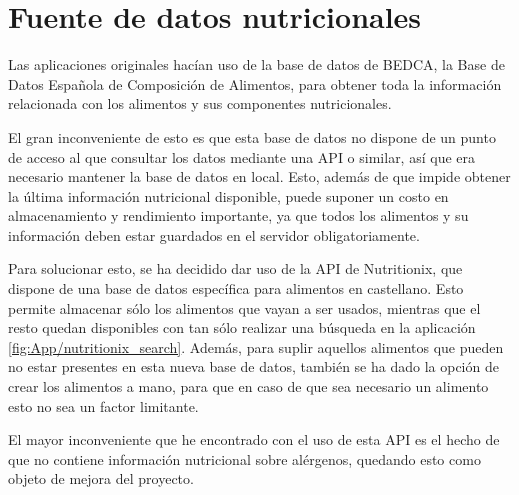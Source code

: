 
\section{Fuente de datos nutricionales}

Las aplicaciones originales hacían uso de la base de datos de BEDCA, la Base de Datos Española de Composición de Alimentos, para obtener toda la información relacionada con los alimentos y sus componentes nutricionales. 

El gran inconveniente de esto es que esta base de datos no dispone de un punto de acceso al que consultar los datos mediante una API o similar, así que era necesario mantener la base de datos en local. Esto, además de que impide obtener la última información nutricional disponible, puede suponer un costo en almacenamiento y rendimiento importante, ya que todos los alimentos y su información deben estar guardados en el servidor obligatoriamente.

Para solucionar esto, se ha decidido dar uso de la API de Nutritionix, que dispone de una base de datos específica para alimentos en castellano. Esto permite almacenar sólo los alimentos que vayan a ser usados, mientras que el resto quedan disponibles con tan sólo realizar una búsqueda en la aplicación \ref{fig:App/nutritionix_search}. Además, para suplir aquellos alimentos que pueden no estar presentes en esta nueva base de datos, también se ha dado la opción de crear los alimentos a mano, para que en caso de que sea necesario un alimento esto no sea un factor limitante. 


El mayor inconveniente que he encontrado con el uso de esta API es el hecho de que no contiene información nutricional sobre alérgenos, quedando esto como objeto de mejora del proyecto.